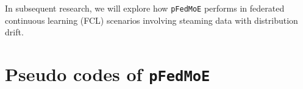 \documentclass[sigconf]{acmart}
\newcommand{\methodname}{{\tt{pFedMoE}}}
\begin{document}
In subsequent research, we will explore how \methodname{} performs in federated continuous learning (FCL) scenarios involving steaming data with distribution drift.










\appendix
\onecolumn

\section{Pseudo codes of \methodname{}}\label{app:pseudo-codes}
\end{document}
